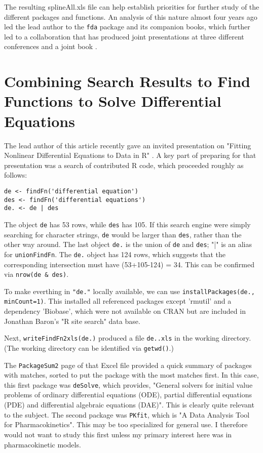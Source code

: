 The resulting splineAll.xls file can help establish priorities 
for further study of the different packages and functions.  An 
analysis of this nature almost four years ago led the lead author 
to the {\tt fda} package and its companion books, which further 
led to a collaboration that has produced joint presentations at 
three different conferences and a joint book \citep{RHG09}.


\section*{Combining Search Results to Find Functions to Solve Differential Equations}

The lead author of this article recently gave an invited presentation
on "Fitting Nonlinear Differential Equations to Data in R" \citep{GHR09}.
A key part of preparing for that presentation was a search of 
contributed R code, which proceeded roughly as follows:

\begin{verbatim}
de <- findFn('differential equation')
des <- findFn('differential equations')
de. <- de | des
\end{verbatim}

The object {\tt de} has 53 rows, while {\tt des} has 105.
If this search engine were simply searching for character
strings, {\tt de} would be larger than {\tt des}, rather than
the other way around.  The last object {\tt de.} is the union
of {\tt de} and {\tt des};  "|" is an alias for {\tt unionFindFn}.
The {\tt de.} object has 124 rows, which suggests that
the corresponding intersection must have (53+105-124) = 34.
This can be confirmed via {\tt nrow(de \& des)}.

To make everthing in {\tt "de."} locally available, we can use
{\tt installPackages(de., minCount=1)}.  This installed all
referenced packages except 'rmutil' and a dependency 'Biobase',
which were not available on CRAN but are included in Jonathan
Baron's "R site search" data base.

Next, {\tt writeFindFn2xls(de.)} produced a file {\tt de..xls}
in the working directory.  (The working directory can be 
identified via {\tt getwd()}.)

The {\tt PackageSum2} page of that Excel file provided a quick
summary of packages with matches, sorted to put the package
with the most matches first.  In this case, this first package
was {\tt deSolve}, which provides, "General solvers for initial
value problems of ordinary differential equations (ODE),
partial differential equations (PDE) and differential
algebraic equations (DAE)".  This is clearly quite relevant
to the subject.  The second package was {\tt PKfit}, which
is "A Data Analysis Tool for Pharmacokinetics".  This may
be too specialized for general use.  I therefore would not
want to study this first unless my primary interest here was in
pharmacokinetic models.

